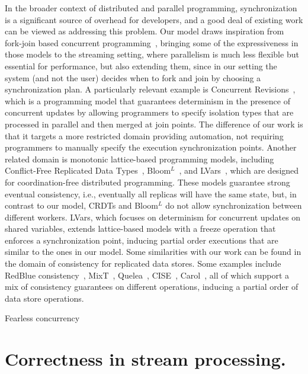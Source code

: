 In the broader context of distributed and parallel programming,
synchronization is a significant source of overhead for developers,
and a good deal of existing work can be viewed as addressing this problem.
Our model draws inspiration from fork-join based
concurrent programming~\cite{frigo1998implementation,lea2000java},
  bringing some of the expressiveness in those models to the streaming setting,
  where parallelism is much less flexible but essential for performance,
  but also extending them, since in our setting the system (and not the user) decides when to fork and join by choosing a synchronization plan.
%
A particularly relevant example is
Concurrent Revisions~\cite{burckhardt2010concurrent},
which is a programming model that guarantees determinism in the presence of concurrent updates by allowing programmers to specify isolation types that are processed in parallel and then merged at join points.
The difference of our work is that it targets a more restricted domain providing automation,
not requiring programmers to manually specify the execution synchronization points.
Another related domain is monotonic lattice-based programming models,
including
Conflict-Free Replicated Data Types~\cite{shapiro2011conflict},
Bloom$^L$~\cite{conway12},
and LVars~\cite{lvars13,lvars14},
which are designed for coordination-free distributed programming.
These models guarantee strong eventual consistency,
i.e., eventually all replicas will have the same state,
but, in contrast to our model, CRDTs and Bloom$^L$
do not allow synchronization between different workers.
LVars, which focuses on determinism for concurrent updates on shared variables,
extends lattice-based models with a freeze operation that enforces a synchronization point,
inducing partial order executions that are similar to the ones in our model.
Some similarities with our work can be found in the domain of consistency for replicated data stores.
Some examples include RedBlue consistency~\cite{li2012making},
MixT~\cite{milano2018mixt},
Quelea~\cite{sivaramakrishnan2015declarative},
CISE~\cite{gotsman16},
Carol~\cite{lewchenko2019sequential},
all of which support a mix of consistency guarantees on different operations,
inducing a partial order of data store operations.

Fearless concurrency~\cite{milano2022flexible}

\section{Correctness in stream processing.}

